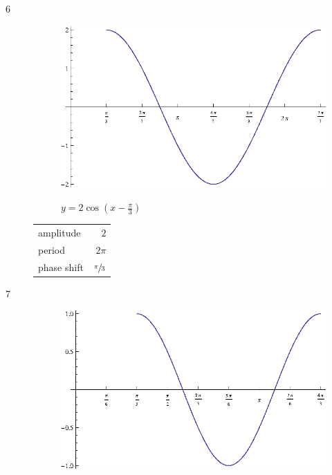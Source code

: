 \documentclass{exam}
\begin{document}
\begin{description}
      \item[6]
        \begin{figure}[H]
          \centering
          \includegraphics[scale=0.8]{example06.eps}

          $y = 2 \cos \left( x - \frac{\pi}{3} \right)$
        \end{figure}

        \begin{tabular}[H]{lr}
          \toprule
          amplitude   & $2$ \\
          period      & $2 \pi$ \\
          phase shift & $\sfrac{\pi}{3}$ \\
          \bottomrule
        \end{tabular}

      \item[7]
        \begin{figure}[H]
          \centering
          \includegraphics[scale=0.8]{example07.eps}


\end{figure}
\end{description}
\end{document}
